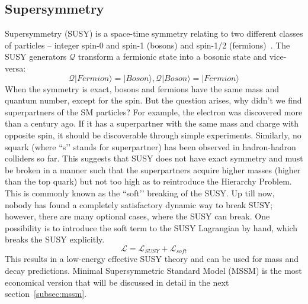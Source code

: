 \subsection{Supersymmetry}
Supersymmetry (SUSY) is a space-time symmetry relating to two different classes of particles – integer spin-0 and spin-1 (bosons) and spin-1/2 (fermions)~\cite{phd_thesis:susy}. The SUSY generators $\mathcal{Q}$ transform a fermionic state into a bosonic state and vice-versa:
\begin{equation}\label{equ:susy_gen}
\mathcal{Q}|Fermion\rangle = |Boson\rangle, \mathcal{Q}|Boson\rangle = |Fermion\rangle
\end{equation}
When the symmetry is exact, bosons and fermions have the same mass and quantum number, except for the spin. But the question arises, why didn’t we find superpartners of the SM particles? For example, the electron was discovered more than a century ago. If it has a superpartner with the same mass and charge with opposite spin, it should be discoverable through simple experiments. Similarly, no squark (where ``s’’ stands for superpartner) has been observed in hadron-hadron colliders so far. This suggests that SUSY does not have exact symmetry and must be broken in a manner such that the superpartners acquire higher masses (higher than the top quark) but not too high as to reintroduce the Hierarchy Problem. This is commonly known as the ``soft’’ breaking of the SUSY. Up till now, nobody has found a completely satisfactory dynamic way to break SUSY; however, there are many optional cases, where the SUSY can break. One possibility is to introduce the soft term to the SUSY Lagrangian by hand, which breaks the SUSY explicitly. 
\begin{equation}\label{equ:soft_break}
\mathcal{L} = \mathcal{L}_{SUSY} + \mathcal{L}_{soft}
\end{equation}
This results in a low-energy effective SUSY theory and can be used for mass and decay predictions. Minimal Supersymmetric Standard Model (MSSM) is the most economical version that will be discussed in detail in the next section~\ref{subsec:mssm}.   
